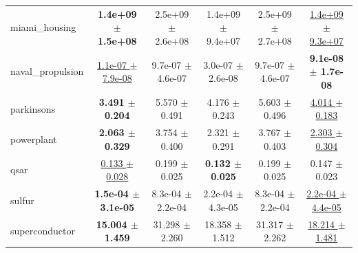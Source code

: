 \begin{table}[!htbp]
{\begin{tabular}{lccccc}
miami\_housing & \textbf{1.4e+09 $\pm$ 1.5e+08} & 2.5e+09 $\pm$ 2.6e+08 & 1.4e+09 $\pm$ 9.4e+07 & 2.5e+09 $\pm$ 2.7e+08 & \underline{1.4e+09 $\pm$ 9.3e+07} \\
naval\_propulsion & \underline{1.1e-07 $\pm$ 7.9e-08} & 9.7e-07 $\pm$ 4.6e-07 & 3.0e-07 $\pm$ 2.6e-08 & 9.7e-07 $\pm$ 4.6e-07 & \textbf{9.1e-08 $\pm$ 1.7e-08} \\
parkinsons & \textbf{3.491 $\pm$ 0.204} & 5.570 $\pm$ 0.491 & 4.176 $\pm$ 0.243 & 5.603 $\pm$ 0.496 & \underline{4.014 $\pm$ 0.183} \\
powerplant & \textbf{2.063 $\pm$ 0.329} & 3.754 $\pm$ 0.400 & 2.321 $\pm$ 0.291 & 3.767 $\pm$ 0.403 & \underline{2.303 $\pm$ 0.304} \\
qsar & \underline{0.133 $\pm$ 0.028} & 0.199 $\pm$ 0.025 & \textbf{0.132 $\pm$ 0.025} & 0.199 $\pm$ 0.025 & 0.147 $\pm$ 0.023 \\
sulfur & \textbf{1.5e-04 $\pm$ 3.1e-05} & 8.3e-04 $\pm$ 2.2e-04 & 2.2e-04 $\pm$ 4.3e-05 & 8.3e-04 $\pm$ 2.2e-04 & \underline{2.2e-04 $\pm$ 4.4e-05} \\
superconductor & \textbf{15.004 $\pm$ 1.459} & 31.298 $\pm$ 2.260 & 18.358 $\pm$ 1.512 & 31.317 $\pm$ 2.262 & \underline{18.214 $\pm$ 1.481} \\
\bottomrule
\end{tabular}
}
\end{table}